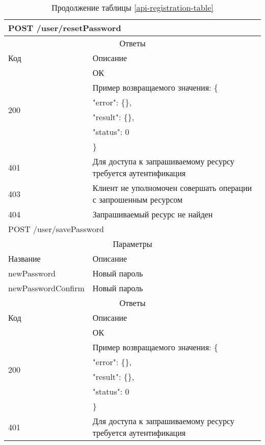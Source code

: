 \begin{table}[H]
  \caption*{Продолжение таблицы \ref{api-registration-table}}
  \begin{tabular}{|p{6cm}|p{10cm}|}
  \hline \multicolumn{2}{|l|}{POST /user/resetPassword} \\
  \hline \multicolumn{2}{|c|}{Ответы} \\
  \hline Код & Описание \\
  \hline \multirow{6}{=}{200} & ОК \\
   & Пример возвращаемого значения: \{ \\
   & "error": \{\}, \\
   & "result": \{\}, \\
   & "status": 0 \\
   & \} \\
  \hline 401 & Для доступа к запрашиваемому ресурсу требуется аутентификация \\
  \hline 403 & Клиент не уполномочен совершать операции с запрошенным ресурсом \\
  \hline 404 & Запрашиваемый ресурс не найден \\
  \hline \multicolumn{2}{|l|}{POST /user/savePassword} \\
  \hline \multicolumn{2}{|c|}{Параметры} \\
  \hline Название & Описание \\
  \hline newPassword & Новый пароль \\
  \hline newPasswordConfirm & Новый пароль \\
  \hline \multicolumn{2}{|c|}{Ответы} \\
  \hline Код & Описание \\
  \hline \multirow{6}{=}{200} & ОК \\
   & Пример возвращаемого значения: \{ \\
   & "error": \{\}, \\
   & "result": \{\}, \\
   & "status": 0 \\
   & \} \\
  \hline 401 & Для доступа к запрашиваемому ресурсу требуется аутентификация \\
  \end{tabular}
\end{table}
